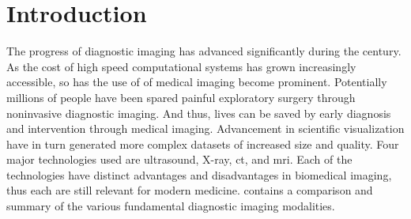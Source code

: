 \chapter{Introduction} \label{cha:introduction}
The progress of diagnostic imaging has advanced significantly during the  century. As the cost of high speed computational systems has grown increasingly accessible, so has the use of of medical imaging become prominent. Potentially millions of people have been spared painful exploratory surgery through noninvasive diagnostic imaging. And thus, lives can be saved by early diagnosis and intervention through medical imaging. Advancement in scientific visualization have in turn generated more complex datasets of increased size and quality. Four major technologies used are ultrasound, X-ray, \gls{ct}, and \gls{mri}. Each of the technologies have distinct advantages and disadvantages in biomedical imaging, thus each are still relevant for modern medicine.  contains a comparison and summary of the various fundamental diagnostic imaging modalities. 

